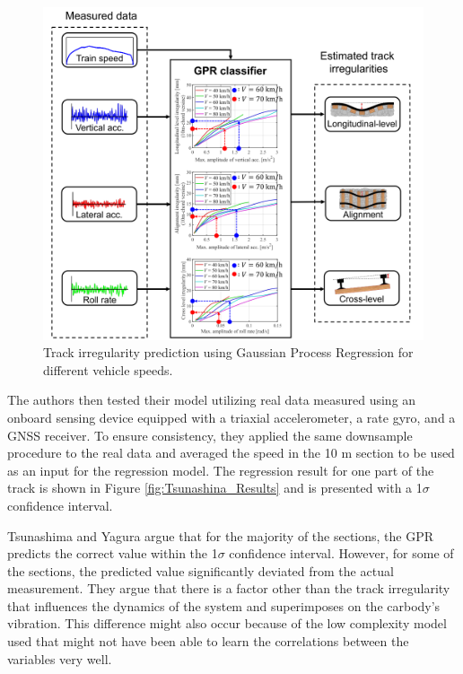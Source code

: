 \begin{figure}[H]
    \centering
    \includegraphics[width=12cm]{Cap2_LitReview/Track_Quality_Accel/Tsunashina (2024)/gpr.png}
    \caption{Track irregularity prediction using Gaussian Process Regression for different vehicle speeds. \cite{vibration7040049}}
    \label{fig:Tsunashina_GPR}
\end{figure}

The authors then tested their model utilizing real data measured using an onboard sensing device equipped with a triaxial accelerometer, a rate gyro, and a GNSS receiver. To ensure consistency, they applied the same downsample procedure to the real data and averaged the speed in the 10 m section to be used as an input for the regression model. The regression result for one part of the track is shown in Figure \ref{fig:Tsunashina_Results} and is presented with a 1$\sigma$ confidence interval. 

Tsunashima and Yagura argue that for the majority of the sections, the GPR predicts the correct value within the 1$\sigma$ confidence interval. However, for some of the sections, the predicted value significantly deviated from the actual measurement. They argue that there is a factor other than the track irregularity that influences the dynamics of the system and superimposes on the carbody's vibration. This difference might also occur because of the low complexity model used that might not have been able to learn the correlations between the variables very well. 

